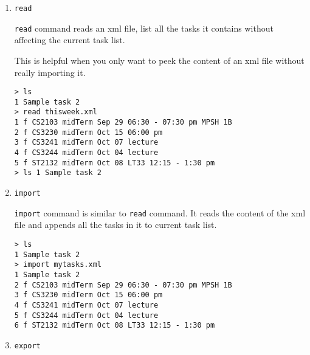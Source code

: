 \documentclass[12pt, a4paper]{article}
\begin{document}
\begin{enumerate}
\item \texttt{read}

\texttt{read} command reads an xml file, list all the tasks it contains without affecting the current task list.

This is helpful when you only want to peek the content of an xml file without really importing it.

\texttt{\textgreater \ ls\\
    1   Sample task 2\\
    \textgreater \ read thisweek.xml \footnotemark \\
    1 f CS2103 midTerm Sep 29 06:30 - 07:30 pm MPSH 1B\\
    2 f CS3230 midTerm Oct 15 06:00 pm\\
    3 f CS3241 midTerm Oct 07 lecture\\
    4 f CS3244 midTerm Oct 04 lecture\\
    5 f ST2132 midTerm Oct 08 LT33 12:15 - 1:30 pm\\
    \textgreater \ ls
    1   Sample task 2}


\item \texttt{import}

\texttt{import} command is similar to \texttt{read} command. It reads the content of the xml file and appends all the tasks in it to current task list.

\texttt{\textgreater \ ls\\
    1   Sample task 2\\
    \textgreater \ import mytasks.xml\\
    1   Sample task 2 \footnotemark\\
    2 f CS2103 midTerm Sep 29 06:30 - 07:30 pm MPSH 1B\\
    3 f CS3230 midTerm Oct 15 06:00 pm\\
    4 f CS3241 midTerm Oct 07 lecture\\
    5 f CS3244 midTerm Oct 04 lecture\\
    6 f ST2132 midTerm Oct 08 LT33 12:15 - 1:30 pm\\}


\item \texttt{export}


\end{enumerate}
\end{document}
